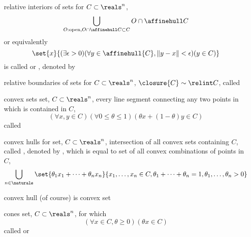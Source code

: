 \documentclass[17pt,landscape]{foils}
\begin{document}
{

\begin{mydefinition}{relative interiors of sets}
	for $C\subset \reals^n$,
	$$
		\bigcup_{O:\mathrm{open}, O\cap \affinehull C\subset C} O \cap \affinehull C
	$$
	or equivalently
	$$
		\set{x}{(\exists \epsilon >0)(\forall y\in \affinehull{C}, \|y-x\|<\epsilon)(y\in C)}
	$$
	is called  or ,
	denoted by 
\end{mydefinition}

\begin{mydefinition}{relative boundaries of sets}
	for $C\subset \reals^n$,
	$\closure{C}\sim \relint C$,
	called 
\end{mydefinition}



\begin{mydefinition}{convex sets}
	set, $C\subset \reals^n$,
	every line segment connecting any two points in which
	is contained in $C$, \ie\
	$$
		\left(
			\forall x,y\in C
		\right)
		\left(
			\forall 0\leq \theta\leq1
		\right)
		\left(
			\theta x + (1-\theta) y \in C
		\right)
	$$
	called 

\end{mydefinition}

\begin{mydefinition}{convex hulls}
	for set, $C\subset \reals^n$,
	intersection of all convex sets containing $C$,
	called ,
	denoted by ,
	which is equal to
	set of all convex combinations of points in $C$, \ie\
	$$
		\bigcup_{n\in\naturals}
		\set{\theta_1 x_1 + \cdots + \theta_n x_n}{x_1,\ldots,x_n\in C, \theta_1 + \cdots + \theta_n=1, \theta_1, \ldots, \theta_n >0}
	$$
\end{mydefinition}

\bit
\item
	convex hull (of course) is convex set
\eit


\myfoilhead{Cones}

\begin{mydefinition}{cones}
	set, $C\subset \reals^n$,
	for which
	$$
		\left(
			\forall x\in C, \theta \geq 0
		\right)
		\left(
			\theta x \in C
		\right)
	$$
	called  or 
\end{mydefinition}

}
\end{document}
